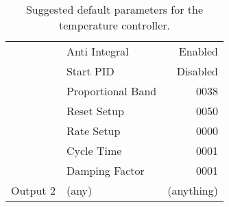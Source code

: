 \begin{table}
\begin{center}
\begin{tabular}{|l|l|r|}
                    & Anti Integral          & Enabled  \\
                    & Start PID              & Disabled \\
                    & Proportional Band      & 0038 \\
                    & Reset Setup            & 0050 \\
                    & Rate Setup             & 0000 \\
                    & Cycle Time             & 0001 \\
                    & Damping Factor         & 0001 \\
\hline
Output 2            & (any)                  & (anything) \\
\hline
\end{tabular}
\end{center}
\caption{Suggested default parameters for the temperature controller.}
\label{tab:ctlparam1}
\end{table}
